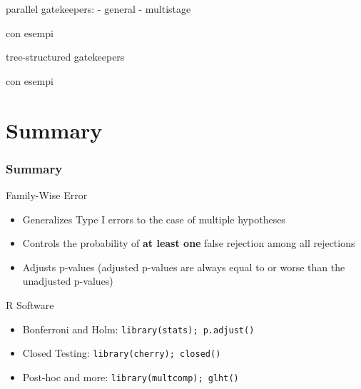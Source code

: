 \documentclass[xcolor={pdftex,dvipsnames,table}]{beamer}
\newcommand{\bb}[1]{\begin{block}{#1}}
\newcommand{\eb}{\end{block}}
\newcommand{\bi}{\begin {itemize}}
\newcommand{\ei}{\end{itemize}}
\newcommand{\bfr}[1]{\begin{frame} \frametitle{#1}}
\begin{document}
\begin{frame}
parallel gatekeepers:
- general
- multistage

con esempi
\end{frame}

\begin{frame}
tree-structured gatekeepers

con esempi
\end{frame}

\section{Summary}
\bfr{Summary}
\bb{Family-Wise Error}
\bi
\item Generalizes Type I errors to the case of multiple hypotheses
\pause
\item Controls the probability of \textbf{at least one} false rejection among all rejections
\pause
\item Adjusts p-values (adjusted p-values are always equal to or worse than the unadjusted p-values)
\ei
\eb
\pause
\bb{R Software}
\bi
\item Bonferroni and Holm: {\tt library(stats); p.adjust()}
\item Closed Testing: {\tt library(cherry); closed()}
\item Post-hoc and more: {\tt library(multcomp); glht()}
\ei
\eb
\end{frame}
\end{document}
